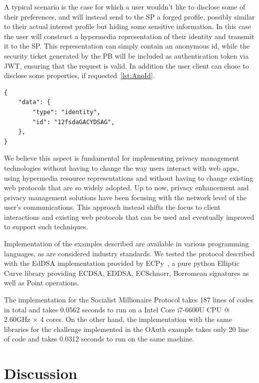 A typical scenario is the case for which a user wouldn't like to disclose some of their preferences, and will instead send to the SP a forged profile, possibly similar to their actual interest profile but hiding some sensitive information. In this case the user will construct a hypermedia representation of their identity and transmit it to the SP. This representation can simply contain an anonymous id, while the security ticket generated by the PB will be included as authentication token via JWT, ensuring that the request is valid. In addition the user client can chose to disclose some properties, if requested~\ref{lst:AnoId}.

\begin{lstlisting}
{
    "data": {
        "type": "identity",
        "id": "12fsdaGACYDSAG",
    },
}
\end{lstlisting}

We believe this aspect is fundamental for implementing privacy management technologies without having to change the way users interact with web apps, using hypermedia resource representations and without having to change existing web protocols that are so widely adopted. Up to now, privacy enhancement and privacy management solutions have been focusing with the network level of the user's communications. This approach instead shifts the focus to client interactions and existing web protocols that can be used and eventually improved to support such techniques.

Implementation of the examples described are available in various programming languages, as are considered industry standards. We tested the protocol described with the EdDSA implementation provided by ECPy~\cite{ecpy}, a pure python Elliptic Curve library providing ECDSA, EDDSA, ECSchnorr, Borromean signatures as well as Point operations.

The implementation for the Socialist Millionaire Protocol takes 187 lines of codes in total and takes 0.0562 seconds to run on a Intel Core i7-6600U CPU @ 2.60GHz × 4 cores. On the other hand, the implementation with the same libraries for the challenge implemented in the OAuth example takes only 20 line of code and takes 0.0312 seconds to run on the same machine.

\section{Discussion}

